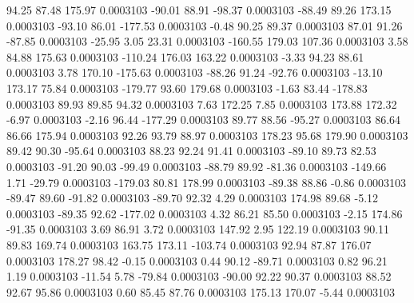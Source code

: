        94.25       87.48      175.97     0.0003103
      -90.01       88.91      -98.37     0.0003103
      -88.49       89.26      173.15     0.0003103
      -93.10       86.01     -177.53     0.0003103
       -0.48       90.25       89.37     0.0003103
       87.01       91.26      -87.85     0.0003103
      -25.95        3.05       23.31     0.0003103
     -160.55      179.03      107.36     0.0003103
        3.58       84.88      175.63     0.0003103
     -110.24      176.03      163.22     0.0003103
       -3.33       94.23       88.61     0.0003103
        3.78      170.10     -175.63     0.0003103
      -88.26       91.24      -92.76     0.0003103
      -13.10      173.17       75.84     0.0003103
     -179.77       93.60      179.68     0.0003103
       -1.63       83.44     -178.83     0.0003103
       89.93       89.85       94.32     0.0003103
        7.63      172.25        7.85     0.0003103
      173.88      172.32       -6.97     0.0003103
       -2.16       96.44     -177.29     0.0003103
       89.77       88.56      -95.27     0.0003103
       86.64       86.66      175.94     0.0003103
       92.26       93.79       88.97     0.0003103
      178.23       95.68      179.90     0.0003103
       89.42       90.30      -95.64     0.0003103
       88.23       92.24       91.41     0.0003103
      -89.10       89.73       82.53     0.0003103
      -91.20       90.03      -99.49     0.0003103
      -88.79       89.92      -81.36     0.0003103
     -149.66        1.71      -29.79     0.0003103
     -179.03       80.81      178.99     0.0003103
      -89.38       88.86       -0.86     0.0003103
      -89.47       89.60      -91.82     0.0003103
      -89.70       92.32        4.29     0.0003103
      174.98       89.68       -5.12     0.0003103
      -89.35       92.62     -177.02     0.0003103
        4.32       86.21       85.50     0.0003103
       -2.15      174.86      -91.35     0.0003103
        3.69       86.91        3.72     0.0003103
      147.92        2.95      122.19     0.0003103
       90.11       89.83      169.74     0.0003103
      163.75      173.11     -103.74     0.0003103
       92.94       87.87      176.07     0.0003103
      178.27       98.42       -0.15     0.0003103
        0.44       90.12      -89.71     0.0003103
        0.82       96.21        1.19     0.0003103
      -11.54        5.78      -79.84     0.0003103
      -90.00       92.22       90.37     0.0003103
       88.52       92.67       95.86     0.0003103
        0.60       85.45       87.76     0.0003103
      175.13      170.07       -5.44     0.0003103
